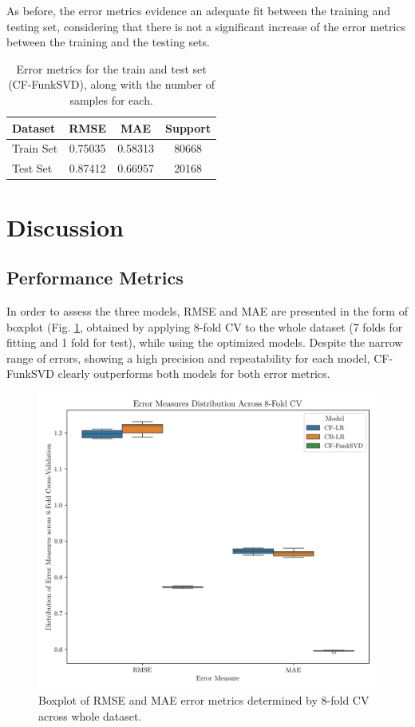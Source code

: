 \documentclass[conference]{IEEEtran}
\begin{document}
As before, the error metrics evidence an adequate fit between the training and testing set, considering that there is not a significant increase of the error metrics between the training and the testing sets.
\newline
\newline
\begin{table}[H]
\centering
\caption{Error metrics for the train and test set (CF-FunkSVD), along with the number of samples for each.}
\label{tab:model03_results}
\begin{tabular}{lccc}
\toprule
\textbf{Dataset} & \textbf{RMSE} & \textbf{MAE} & \textbf{Support} \\
\midrule
Train Set & 0.75035 & 0.58313 & 80668 \\
Test Set & 0.87412 & 0.66957 & 20168 \\
\bottomrule
\end{tabular}
\end{table}


\section{Discussion} 
\subsection{Performance Metrics}

In order to assess the three models, RMSE and MAE are presented in the form of boxplot (Fig. \ref{fig:results_boxplot}, obtained by applying 8-fold CV to the whole dataset (7 folds for fitting and 1 fold for test), while using the optimized models. Despite the narrow range of errors, showing a high precision and repeatability for each model, CF-FunkSVD clearly outperforms both models for both error metrics.

\begin{figure}[H]
    \centering
    \includegraphics[width=1\linewidth]{assets/results_boxplot.png}
    \caption{Boxplot of RMSE and MAE error metrics determined by 8-fold CV across whole dataset.}
    \label{fig:results_boxplot}
\end{figure}
\end{document}
